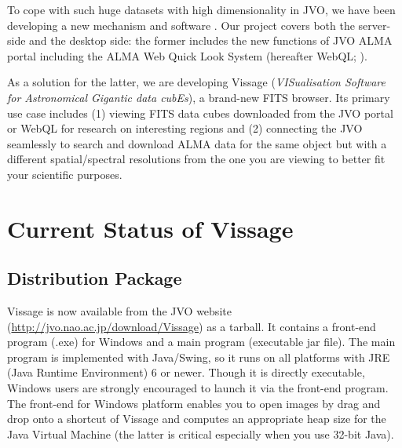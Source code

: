 To cope with such huge datasets with high dimensionality in JVO, we have been developing a new mechanism and software \citep{O10_adassxxii, D5_adassxxii}. Our project covers both the server-side and the desktop side: the former includes the new functions of JVO ALMA portal including the ALMA Web Quick Look System (hereafter WebQL; \citet{O10_adassxxii}). 

As a solution for the latter, we are developing Vissage ({\it VISualisation Software for Astronomical Gigantic data cubEs}), a brand-new FITS browser. Its primary use case includes (1) viewing FITS data cubes downloaded from the JVO portal or WebQL for research on interesting regions and (2) connecting the JVO seamlessly to search and download ALMA data for the same object but with a different spatial/spectral resolutions from the one you are viewing to better fit your scientific purposes. 

\section{Current Status of Vissage}
\subsection{Distribution Package}
Vissage is now available from the JVO website (\url{http://jvo.nao.ac.jp/download/Vissage}) as a tarball. It contains a front-end program (.exe) for Windows and a main program (executable jar file). The main program is implemented with Java/Swing, so it runs on all platforms with JRE (Java Runtime Environment) 6 or newer. Though it is directly executable, Windows users are strongly encouraged to launch it via the front-end program. The front-end for Windows platform enables you to open images by drag and drop onto a shortcut of Vissage and computes an appropriate heap size for the Java Virtual Machine (the latter is critical especially when you use 32-bit Java). 

